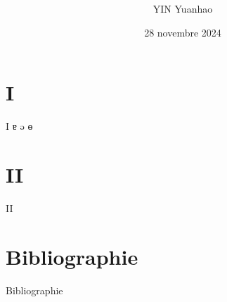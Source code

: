 \documentclass[hyperref={colorlinks=true, linkcolor=blue, anchorcolor=blue, citecolor=blue, urlcolor=red}]{beamer}
\title[]{\textbf{}}%
\author[]{YIN Yuanhao}%
\institute[]{CNRS-CRLAO-INALCO}%
\date[]
{28 novembre 2024}%
\begin{document}
\frame{\titlepage}

\section{\textbf{I}}
\begin{frame}{I}
    ɐ
    ə
    ɵ
\end{frame}

\section{\textbf{II}}
\begin{frame}{II}

\end{frame}

\section*{\textbf{Bibliographie}}
\begin{frame}[allowframebreaks]{Bibliographie}
    \printbibliography
\end{frame}
\end{document}
